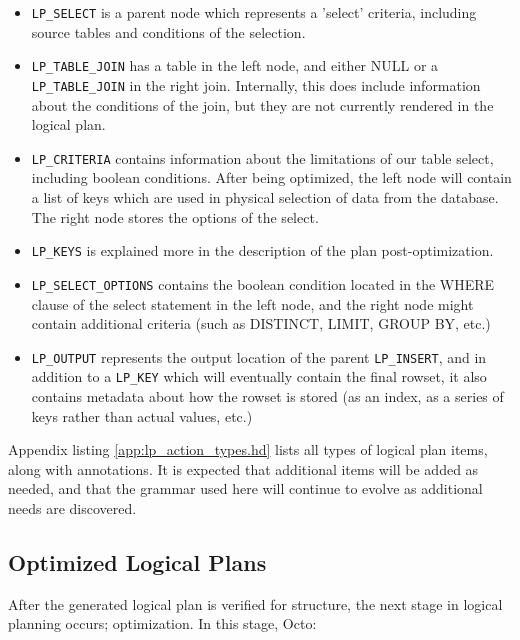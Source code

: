\documentclass[]{article}
\def\code#1{\texttt{#1}}
\begin{document}
\begin{itemize}
	\item \code{LP\_SELECT} is a parent node which represents a 'select' criteria, including source tables and conditions of the selection.
	\item \code{LP\_TABLE\_JOIN} has a table in the left node, and either NULL or a \code{LP\_TABLE\_JOIN} in the right join. Internally, this does include information about the conditions of the join, but they are not currently rendered in the logical plan.
	\item \code{LP\_CRITERIA} contains information about the limitations of our table select, including boolean conditions. After being optimized, the left node will contain a list of keys which are used in physical selection of data from the database. The right node stores the options of the select.
	\item \code{LP\_KEYS} is explained more in the description of the plan post-optimization.
	\item \code{LP\_SELECT\_OPTIONS} contains the boolean condition located in the WHERE clause of the select statement in the left node, and the right node might contain additional criteria (such as DISTINCT, LIMIT, GROUP BY, etc.)
	\item \code{LP\_OUTPUT} represents the output location of the parent \code{LP\_INSERT}, and in addition to a \code{LP\_KEY} which will eventually contain the final rowset, it also contains metadata about how the rowset is stored (as an index, as a series of keys rather than actual values, etc.)
\end{itemize}

Appendix listing \ref{app:lp_action_types.hd} lists all types of logical plan items, along with annotations.
It is expected that additional items will be added as needed, and that the grammar used here will continue to evolve as additional needs are discovered.

\subsection{Optimized Logical Plans} \label{sec:lp_optimization}

After the generated logical plan is verified for structure, the next stage in logical planning occurs; optimization.
In this stage, Octo:
\end{document}
